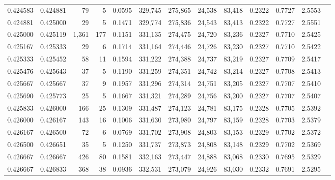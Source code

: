 \begin{tabular}{rrrrrrrrrrrrr}
0.424583 & 0.424881 &    79 &   5 &                                     0.0595 & 329,745 & 275,865 &  24,538 &  83,418 & 0.2322 & 0.7727 & 2.5553 \\
0.424881 & 0.425000 &    29 &   5 &                                     0.1471 & 329,774 & 275,836 &  24,543 &  83,413 & 0.2322 & 0.7727 & 2.5551 \\
0.425000 & 0.425119 & 1,361 & 177 &                                     0.1151 & 331,135 & 274,475 &  24,720 &  83,236 & 0.2327 & 0.7710 & 2.5425 \\
0.425167 & 0.425333 &    29 &   6 &                                     0.1714 & 331,164 & 274,446 &  24,726 &  83,230 & 0.2327 & 0.7710 & 2.5422 \\
0.425333 & 0.425452 &    58 &  11 &                                     0.1594 & 331,222 & 274,388 &  24,737 &  83,219 & 0.2327 & 0.7709 & 2.5417 \\
0.425476 & 0.425643 &    37 &   5 &                                     0.1190 & 331,259 & 274,351 &  24,742 &  83,214 & 0.2327 & 0.7708 & 2.5413 \\
0.425667 & 0.425667 &    37 &   9 &                                     0.1957 & 331,296 & 274,314 &  24,751 &  83,205 & 0.2327 & 0.7707 & 2.5410 \\
0.425690 & 0.425773 &    25 &   5 &                                     0.1667 & 331,321 & 274,289 &  24,756 &  83,200 & 0.2327 & 0.7707 & 2.5407 \\
0.425833 & 0.426000 &   166 &  25 &                                     0.1309 & 331,487 & 274,123 &  24,781 &  83,175 & 0.2328 & 0.7705 & 2.5392 \\
0.426000 & 0.426167 &   143 &  16 &                                     0.1006 & 331,630 & 273,980 &  24,797 &  83,159 & 0.2328 & 0.7703 & 2.5379 \\
0.426167 & 0.426500 &    72 &   6 &                                     0.0769 & 331,702 & 273,908 &  24,803 &  83,153 & 0.2329 & 0.7702 & 2.5372 \\
0.426500 & 0.426651 &    35 &   5 &                                     0.1250 & 331,737 & 273,873 &  24,808 &  83,148 & 0.2329 & 0.7702 & 2.5369 \\
0.426667 & 0.426667 &   426 &  80 &                                     0.1581 & 332,163 & 273,447 &  24,888 &  83,068 & 0.2330 & 0.7695 & 2.5329 \\
0.426667 & 0.426833 &   368 &  38 &                                     0.0936 & 332,531 & 273,079 &  24,926 &  83,030 & 0.2332 & 0.7691 & 2.5295 \\

\end{tabular}
